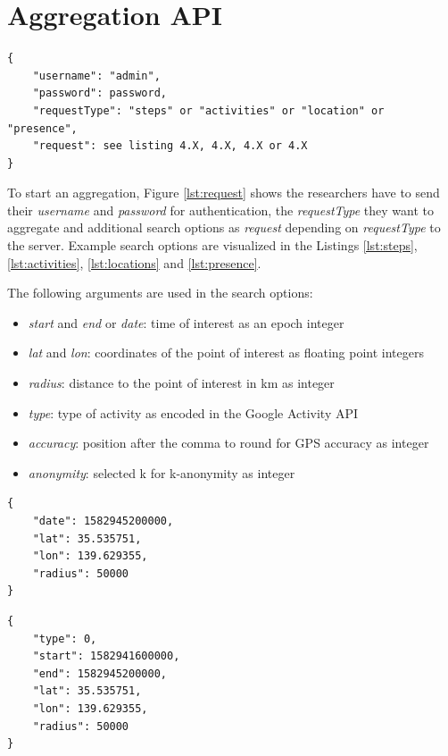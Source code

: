 \section{Aggregation API}

\begin{lstlisting}[caption=Initial aggregation request from researcher, label={lst:request}]
{
    "username": "admin",
    "password": password,
    "requestType": "steps" or "activities" or "location" or "presence",
    "request": see listing 4.X, 4.X, 4.X or 4.X
}
\end{lstlisting}

To start an aggregation, Figure \ref{lst:request} shows the researchers have to send their \textit{username} and \textit{password} for authentication, the \textit{requestType} they want to aggregate and additional search options as \textit{request} depending on \textit{requestType} to the server. Example search options are visualized in the Listings \ref{lst:steps}, \ref{lst:activities}, \ref{lst:locations} and \ref{lst:presence}.

The following arguments are used in the search options:
\begin{itemize}
    \item \textit{start} and \textit{end} or \textit{date}: time of interest as an epoch integer
    \item \textit{lat} and \textit{lon}: coordinates of the point of interest as floating point integers
    \item \textit{radius}: distance to the point of interest in km as integer
    \item \textit{type}: type of activity as encoded in the Google Activity API \cite{detectedactivity}
    \item \textit{accuracy}: position after the comma to round for GPS accuracy as integer
    \item \textit{anonymity}: selected k for k-anonymity as integer
\end{itemize}

\begin{lstlisting}[caption=Search options for steps, label={lst:steps}]
{
    "date": 1582945200000,
    "lat": 35.535751,
    "lon": 139.629355,
    "radius": 50000
}
\end{lstlisting}

\begin{lstlisting}[caption=Search options for activities, label={lst:activities}]
{
    "type": 0,
    "start": 1582941600000,
    "end": 1582945200000,
    "lat": 35.535751,
    "lon": 139.629355,
    "radius": 50000
}
\end{lstlisting}

